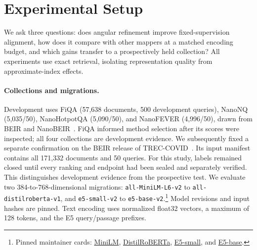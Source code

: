\section{Experimental Setup}
\label{sec:setup}

We ask three questions: does angular refinement improve fixed-supervision
alignment, how does it compare with other mappers at a matched encoding
budget, and which gains transfer to a prospectively held collection?
All experiments use exact retrieval, isolating representation quality from
approximate-index effects.

\paragraph{Collections and migrations.}
Development uses FiQA (57,638 documents, 500 development queries), NanoNQ
(5,035/50), NanoHotpotQA (5,090/50), and NanoFEVER (4,996/50), drawn from
BEIR and NanoBEIR~\cite{beir2021,nanobeir}. FiQA informed method selection
after its scores were inspected; all four collections are development evidence.
We subsequently fixed a separate confirmation on the BEIR release of
TREC-COVID~\cite{treccovid2020,beir2021}. Its input manifest contains all
171,332 documents and 50 queries. For this study, labels remained
closed until every ranking and endpoint had been sealed and separately
verified. This distinguishes development evidence from the prospective test.
We evaluate two 384-to-768-dimensional migrations:
\texttt{all-MiniLM-L6-v2} to \texttt{all-distilroberta-v1}, and
\texttt{e5-small-v2} to \texttt{e5-base-v2}.\footnote{Pinned maintainer cards:
\href{https://huggingface.co/sentence-transformers/all-MiniLM-L6-v2/blob/1110a243fdf4706b3f48f1d95db1a4f5529b4d41/README.md}{MiniLM},
\href{https://huggingface.co/sentence-transformers/all-distilroberta-v1/blob/842eaed40bee4d61673a81c92d5689a8fed7a09f/README.md}{DistilRoBERTa},
\href{https://huggingface.co/intfloat/e5-small-v2/blob/ffb93f3bd4047442299a41ebb6fa998a38507c52/README.md}{E5-small}, and
\href{https://huggingface.co/intfloat/e5-base-v2/blob/f52bf8ec8c7124536f0efb74aca902b2995e5bcd/README.md}{E5-base}.}
Model revisions and input hashes are pinned. Text encoding uses normalized
float32 vectors, a maximum of 128 tokens, and the E5 query/passage prefixes.

